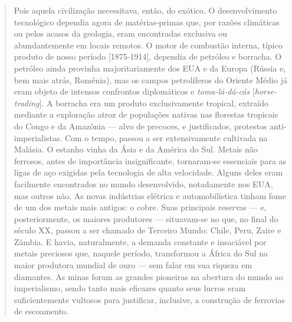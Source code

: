 \begin{quote}
    Pois aquela civilização necessitava, então, do exótico. O desenvolvimento tecnológico dependia agora de matérias-primas que, por razões climáticas ou pelos acasos da geologia, eram encontradas exclusiva ou abundantemente em locais remotos. O motor de combustão interna, típico produto de nosso período [1875-1914], dependia de petróleo e borracha. O petróleo ainda provinha majoritariamente dos EUA e da Europa (Rússia e, bem mais atrás, Romênia), mas os campos petrolíferos do Oriente Médio já eram objeto de intensos confrontos diplomáticos e \textit{toma-lá-dá-cás} [\textit{horse-trading}]. A borracha era um produto exclusivamente tropical, extraído mediante a exploração atroz de populações nativas nas florestas tropicais do Congo e da Amazônia --- alvo de precoces, e justificados, protestos anti-imperialistas. Com o tempo, passou a ser extensivamente cultivada na Malásia. O estanho vinha da Ásia e da América do Sul. Metais não ferrosos, antes de importância insignificante, tornaram-se essenciais para as ligas de aço exigidas pela tecnologia de alta velocidade. Alguns deles eram facilmente encontrados no mundo desenvolvido, notadamente nos EUA, mas outros não. As novas indústrias elétrica e automobilística tinham fome de um dos metais mais antigos: o cobre. Suas principais reservas --- e, posteriormente, os maiores produtores --- situavam-se no que, no final do século XX, passou a ser chamado de Terceiro Mundo: Chile, Peru, Zaire e Zâmbia. E havia, naturalmente, a demanda constante e insaciável por metais preciosos que, naquele período, transformou a África do Sul na maior produtora mundial de ouro --- sem falar em sua riqueza em diamantes. As minas foram as grandes pioneiras na abertura do mundo ao imperialismo, sendo tanto mais eficazes quanto seus lucros eram suficientemente vultosos para justificar, inclusive, a construção de ferrovias de escoamento. \parencite[p. 63]{Hobsbawm1987}
\end{quote}



